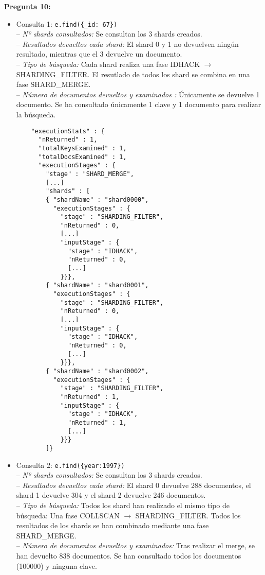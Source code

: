 \documentclass[11pt,a4paper]{article}
\begin{document}
\newpage{}
\textbf{Pregunta 10:}
\begin{itemize}
\item Consulta 1: \texttt{e.find(\{\_id: 67\})}\\
  -- \emph{Nº shards consultados:} Se consultan los 3 shards creados.
  \\-- \emph{Resultados devueltos cada shard:} El shard 0 y 1 no devuelven ningún
  resultado, mientras que el 3 devuelve un documento.
  \\-- \emph{Tipo de búsqueda:} Cada shard realiza una fase IDHACK $\rightarrow$
  SHARDING\_FILTER. El resutlado de todos los shard se combina en una fase SHARD\_MERGE.
  \\-- \emph{Número de documentos devueltos y examinados :} Únicamente se
  devuelve 1 documento. Se ha consultado únicamente 1 clave y 1 documento
  para realizar la búsqueda.

  \begin{lstlisting}
    "executionStats" : {
      "nReturned" : 1,
      "totalKeysExamined" : 1,
      "totalDocsExamined" : 1,
      "executionStages" : {
        "stage" : "SHARD_MERGE",
        [...]
        "shards" : [
        { "shardName" : "shard0000",
          "executionStages" : {
            "stage" : "SHARDING_FILTER",
            "nReturned" : 0,
            [...]
            "inputStage" : {
              "stage" : "IDHACK",
              "nReturned" : 0,
              [...]
            }}},
        { "shardName" : "shard0001",
          "executionStages" : {
            "stage" : "SHARDING_FILTER",
            "nReturned" : 0,
            [...]
            "inputStage" : {
              "stage" : "IDHACK",
              "nReturned" : 0,
              [...]
            }}},
        { "shardName" : "shard0002",
          "executionStages" : {
            "stage" : "SHARDING_FILTER",
            "nReturned" : 1,
            "inputStage" : {
              "stage" : "IDHACK",
              "nReturned" : 1,
              [...]
            }}}
        ]}
    \end{lstlisting}

\item Consulta 2: \texttt{e.find(\{year:1997\})}\\
  -- \emph{Nº shards consultados:} Se consultan los 3 shards creados.
  \\-- \emph{Resultados devueltos cada shard:} El shard 0 devuelve 288
  documentos, el shard 1 devuelve 304 y el shard 2 devuelve 246 documentos.
  \\-- \emph{Tipo de búsqueda:} Todos los shard han realizado el mismo típo
  de búsqueda: Una fase COLLSCAN $\rightarrow$ SHARDING\_FILTER. Todos los
  resultados de los shards se han combinado mediante una fase SHARD\_MERGE.
  \\-- \emph{Número de documentos devueltos y examinados:} Tras realizar el merge, se
  han devuelto 838 documentos. Se han consultado todos los documentos
  (100000) y ninguna clave.


\end{itemize}
\end{document}
